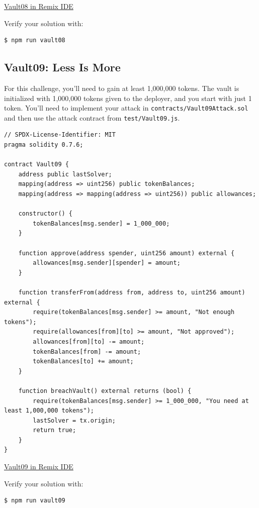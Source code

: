 \documentclass[12pt]{article}
\begin{document}
\medskip
\noindent
\href{https://remix.ethereum.org/?#activate=solidity&url=https://github.com/radovluk/unbreakable-vault/contracts/Vault08.sol&lang=en&optimize=false&runs=200&evmVersion=null&version=soljson-v0.7.6+commit.7338295f.js}{Vault08 in Remix IDE}

\medskip
\noindent
Verify your solution with:
\begin{verbatim}
$ npm run vault08
\end{verbatim}

\subsection*{Vault09: Less Is More}

For this challenge, you'll need to gain at least 1,000,000 tokens. The vault is
initialized with 1,000,000 tokens given to the deployer, and you start with
just 1 token. You'll need to implement your attack in
\texttt{contracts/Vault09Attack.sol} and then use the attack contract from
\texttt{test/Vault09.js}.

\noindent
\begin{minipage}{\textwidth}
    \begin{lstlisting}[language=Solidity]
// SPDX-License-Identifier: MIT
pragma solidity 0.7.6;

contract Vault09 {
    address public lastSolver;
    mapping(address => uint256) public tokenBalances;
    mapping(address => mapping(address => uint256)) public allowances;
    
    constructor() {
        tokenBalances[msg.sender] = 1_000_000;
    }
    
    function approve(address spender, uint256 amount) external {
        allowances[msg.sender][spender] = amount;
    }
    
    function transferFrom(address from, address to, uint256 amount) external {
        require(tokenBalances[msg.sender] >= amount, "Not enough tokens");
        require(allowances[from][to] >= amount, "Not approved");
        allowances[from][to] -= amount;
        tokenBalances[from] -= amount;
        tokenBalances[to] += amount;
    }
    
    function breachVault() external returns (bool) {
        require(tokenBalances[msg.sender] >= 1_000_000, "You need at least 1,000,000 tokens");
        lastSolver = tx.origin;
        return true;
    }
}
\end{lstlisting}
\end{minipage}

\medskip
\noindent
\href{https://remix.ethereum.org/?#activate=solidity&url=https://github.com/radovluk/unbreakable-vault/contracts/Vault09.sol&lang=en&optimize=false&runs=200&evmVersion=null&version=soljson-v0.7.6+commit.7338295f.js}{Vault09 in Remix IDE}

\medskip
\noindent
Verify your solution with:
\begin{verbatim}
$ npm run vault09
\end{verbatim}
\end{document}
